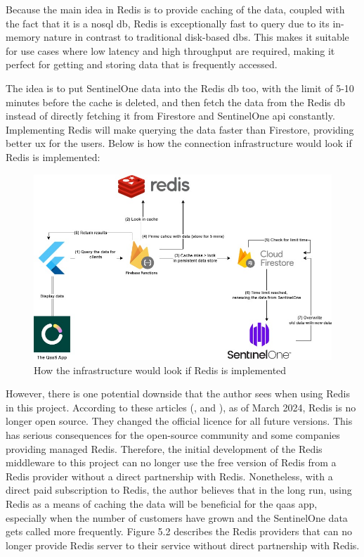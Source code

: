 Because the main idea in Redis is to provide caching of the data, coupled with the fact that it is a \acrshort{nosql} \acrshort{db},
Redis is exceptionally fast to query due to its in-memory nature in contrast to traditional disk-based \acrshort{db}s. This makes it
suitable for use cases where low latency and high throughput are required, making it perfect for getting and storing data that is
frequently accessed.

The idea is to put SentinelOne data into the Redis \acrshort{db} too, with the limit of 5-10 minutes before the cache is deleted,
and then fetch the data from the Redis \acrshort{db} instead of directly fetching it from Firestore and SentinelOne \acrshort{api}
constantly. Implementing Redis will make querying the data faster than Firestore, providing better \acrshort{ux} for the users.
Below is how the connection infrastructure would look if Redis is implemented:

\begin{figure}[H]
  \centering
  \includegraphics[width=1.0\textwidth]{Figures/Redis Caching.jpg}
  \caption{How the infrastructure would look if Redis is implemented}
\end{figure}

However, there is one potential downside that the author sees when using Redis in this project. According to these articles
(\textit{\cite{redisIsNoLongerFree}}, and \textit{\cite{redisMomento}}), as of March 2024, Redis is no  longer open source. They
changed the official licence for all future versions. This has serious consequences for the open-source community and some companies
providing managed Redis. Therefore, the initial development of the Redis middleware to this project can no longer use the free version
of Redis from a Redis provider without a direct partnership with Redis. Nonetheless, with a direct paid subscription to Redis, the
author believes that in the long run, using Redis as a means of caching the data will be beneficial for the \acrshort{qaas} app,
especially when the number of customers have grown and the SentinelOne data gets called more frequently. Figure 5.2 describes
the Redis providers that can no longer provide Redis server to their service without direct partnership with Redis.

